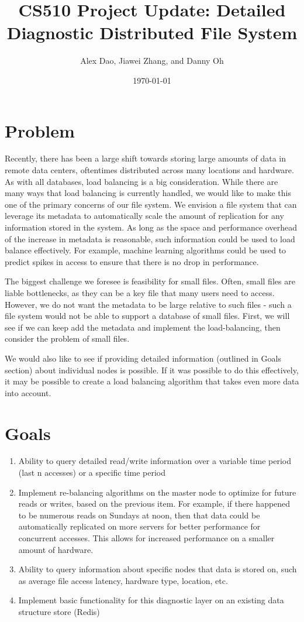\documentclass{article}
\title{CS510 Project Update: Detailed Diagnostic Distributed File System}
\date{\today}
\author{Alex Dao, Jiawei Zhang, and Danny Oh}
\begin{document}
\maketitle

\section{Problem}
Recently, there has been a large shift towards storing large amounts of data in remote data centers, oftentimes distributed across many locations and hardware. As with all databases, load balancing is a big consideration. While there are many ways that load balancing is currently handled, we would like to make this one of the primary concerns of our file system. We envision a file system that can leverage its metadata to automatically scale the amount of replication for any information stored in the system. As long as the space and performance overhead of the increase in metadata is reasonable, such information could be used to load balance effectively. For example, machine learning algorithms could be used to predict spikes in access to ensure that there is no drop in performance. 

The biggest challenge we foresee is feasibility for small files. Often, small files are liable bottlenecks, as they can be a key file that many users need to access. However, we do not want the metadata to be large relative to such files - such a file system would not be able to support a database of small files. First, we will see if we can keep add the metadata and implement the load-balancing, then consider the problem of small files.

We would also like to see if providing detailed information (outlined in Goals section) about individual nodes is possible. If it was possible to do this effectively, it may be possible to create a load balancing algorithm that takes even more data into account.

\section{Goals}
\begin{enumerate}
\item Ability to query detailed read/write information over a variable time period (last n accesses) or a specific time period
\item Implement re-balancing algorithms on the master node to optimize for future reads or writes, based on the previous item. For example, if there happened to be numerous reads on Sundays at noon, then that data could be automatically replicated on more servers for better performance for concurrent accesses. This allows for increased performance on a smaller amount of hardware. 
\item Ability to query information about specific nodes that data is stored on, such as average file access latency, hardware type, location, etc. 
\item Implement basic functionality for this diagnostic layer on an existing data structure store (Redis)
\end{enumerate}
\end{document}
